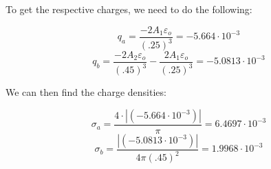 \begin{enumerate}
        To get the respective charges, we need to do the following:

        $$q_a=\frac{-2A_1\varepsilon_o}{(.25)^3}=-5.664\cdot10^{-3}$$
        $$q_b=\frac{-2A_2\varepsilon_o}{(.45)^3}-\frac{2A_1\varepsilon_o}{(.25)^3}=-5.0813\cdot10^{-3}$$

        We can then find the charge densities:

        $$\boxed{\sigma_a=\frac{4\cdot|(-5.664\cdot10^{-3})|}{\pi}=6.4697\cdot10^{-3}}$$
        $$\boxed{\sigma_b=\frac{|(-5.0813\cdot10^{-3})|}{4\pi(.45)^2}=1.9968\cdot10^{-3}}$$
    
\end{enumerate}



